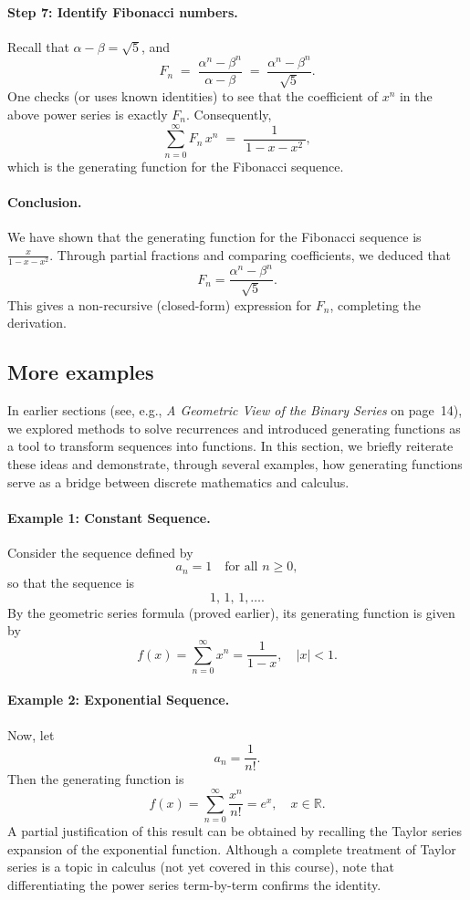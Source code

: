 \documentclass{article}
\begin{document}
\paragraph{Step 7: Identify Fibonacci numbers.}

Recall that \(\alpha - \beta = \sqrt{5}\), and
\[
F_n
\;=\;
\frac{\alpha^n - \beta^n}{\,\alpha - \beta\,}
\;=\;
\frac{\alpha^n - \beta^n}{\,\sqrt{5}\,}.
\]
One checks (or uses known identities) to see that the coefficient of \(x^n\) in the above power series is exactly \(F_n\).  Consequently,
\[
\sum_{n=0}^\infty F_n \, x^n
\;=\;
\frac{1}{\,1 - x - x^2\,},
\]
which is the generating function for the Fibonacci sequence.

\paragraph{Conclusion.}
We have shown that the generating function for the Fibonacci sequence is 
\(\tfrac{x}{1 - x - x^2}\).  
Through partial fractions and comparing coefficients, we deduced that
\[
F_n = \frac{\alpha^n - \beta^n}{\sqrt{5}}.
\]
This gives a non-recursive (closed-form) expression for \(F_n\), completing the derivation.

\subsection{More examples}

In earlier sections (see, e.g., \emph{A Geometric View of the Binary Series} on page~14), we explored methods to solve recurrences and introduced generating functions as a tool to transform sequences into functions. In this section, we briefly reiterate these ideas and demonstrate, through several examples, how generating functions serve as a bridge between discrete mathematics and calculus.

\paragraph{Example 1: Constant Sequence.}  
Consider the sequence defined by
\[
a_n=1 \quad \text{for all } n\ge0,
\]
so that the sequence is
\[
1,\,1,\,1,\dots.
\]
By the geometric series formula (proved earlier), its generating function is given by
\[
f(x)=\sum_{n=0}^{\infty} x^n=\frac{1}{1-x}, \quad |x|<1.
\]

\paragraph{Example 2: Exponential Sequence.}  
Now, let
\[
a_n=\frac{1}{n!}.
\]
Then the generating function is
\[
f(x)=\sum_{n=0}^{\infty} \frac{x^n}{n!}=e^x, \quad x\in\mathbb{R}.
\]
A partial justification of this result can be obtained by recalling the Taylor series expansion of the exponential function. Although a complete treatment of Taylor series is a topic in calculus (not yet covered in this course), note that differentiating the power series term-by-term confirms the identity.
\end{document}
